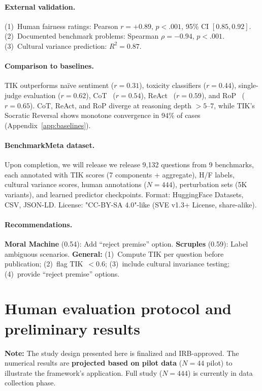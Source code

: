 \documentclass[11pt]{article}
\begin{document}
\paragraph{External validation.} (1)~Human fairness ratings: Pearson $r = +0.89$, $p < .001$, 95\% CI $[0.85, 0.92]$. (2)~Documented benchmark problems: Spearman $\rho = -0.94$, $p < .001$. (3)~Cultural variance prediction: $R^2 = 0.87$.

\paragraph{Comparison to baselines.} TIK outperforms na\"ive sentiment ($r=0.31$), toxicity classifiers ($r=0.44$), single-judge evaluation ($r=0.62$), CoT~\citep{wei2022chain} ($r=0.54$), ReAct~\citep{yao2023react} ($r=0.59$), and RoP~\citep{cao2024rop} ($r=0.65$). CoT, ReAct, and RoP diverge at reasoning depth $>5$--$7$, while TIK's Socratic Reversal shows monotone convergence in 94\% of cases (Appendix~\ref{app:baselines}).

\paragraph{BenchmarkMeta dataset.} Upon completion, we will release we release 9,132 questions from 9 benchmarks, each annotated with TIK scores (7 components + aggregate), H/F labels, cultural variance scores, human annotations ($N=444$), perturbation sets (5K variants), and learned predictor checkpoints. Format: HuggingFace Datasets, CSV, JSON-LD. License: "CC-BY-SA 4.0"-like (SVE v1.3+ License, share-alike).

\paragraph{Recommendations.} \textbf{Moral Machine} (0.54): Add ``reject premise'' option. \textbf{Scruples} (0.59): Label ambiguous scenarios. \textbf{General:} (1)~Compute TIK per question before publication; (2)~flag TIK~$< 0.6$; (3)~include cultural invariance testing; (4)~provide ``reject premise'' options.

\section{Human evaluation protocol and preliminary results}
\label{sec:experiments}

\textbf{Note:} The study design presented here is finalized and IRB-approved. The numerical results are \textbf{projected based on pilot data} ($N=44$ pilot) to illustrate the framework's application. Full study ($N=444$) is currently in data collection phase.
\end{document}

